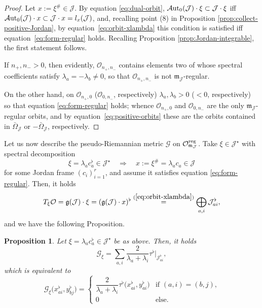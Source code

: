 \documentclass[pdftex]{sigma}
\numberwithin{equation}{section}
\newtheorem{Proposition}[Theorem]{Proposition}
 { \theoremstyle{definition}
\newtheorem{Definition}[Theorem]{Definition}
\newtheorem{Note}[Theorem]{Note}
\newtheorem{Example}[Theorem]{Example}
\newtheorem{Remark}[Theorem]{Remark} }
\newcommand{\be}{\begin{equation}}
\newcommand{\ee}{\end{equation}}
\newcommand{\Aut}{\mathcal{A}{\rm ut}}
\newcommand{\ocal}{\mathcal{O}}
\newcommand{\Jcal}{\mathcal{J}}
\newcommand{\m}{\mathfrak{m}}
\renewcommand{\m}{{\mathfrak m}}
\newcommand{\Gcal}{\mathcal{G}}
\begin{document}
\begin{proof}
Let $x := \xi^\# \in \Jcal$.
By equation \eqref{eq:dual-orbit}, $\Aut_0(\Jcal) \cdot \xi \subset \Jcal \cdot \xi$ iff $\Aut_0(\Jcal) \cdot x \subset \Jcal \cdot x = l_x(\Jcal)$, and, {recalling point (8) in Proposition \ref{prop:collect-positive-Jordan}}, by equation~\eqref{eq:orbit-xlambda} this condition is satisfied iff equation~\eqref{eq:form-regular} holds.
Recalling Proposition \ref{prop:Jordan-integrable}, the first statement follows.

If $n_+, n_- > 0$, then evidently, $\ocal_{n_+, n_-}$ contains elements two of whose spectral coefficients satisfy $\lambda_a = - \lambda_b \neq 0$, so that $\ocal_{n_+, n_-}$ is not $\m_\Jcal$-regular.

On the other hand, on $\ocal_{n_+, 0}$ ($\ocal_{0, n_-}$, respectively) $\lambda_a, \lambda_b > 0$ ($< 0$, respectively) so that equation \eqref{eq:form-regular} holds; whence $\ocal_{n_+, 0}$ and $\ocal_{0, n_-}$ are the only $\m_\Jcal$-regular orbits, and by equation~\eqref{eq:positive-orbits} these are the orbits contained in $\bar \Omega_\Jcal$ or $-\bar \Omega_\Jcal$, respectively.
\end{proof}

Let us now describe the pseudo-Riemannian metric $\Gcal$ on $\ocal^{\rm reg}_{\m_{\Jcal}}$.
Take $\xi\in\Jcal^{\star}$ with spectral decomposition
\be \label{eq:define-xi}
\xi = \lambda_a c_a^\flat \in \Jcal^\star \quad \Rightarrow \quad x := \xi^\# = \lambda_a c_a \in \Jcal
\ee
for some Jordan frame $(c_i)_{i=1}^r$, and assume it satisfies equation \eqref{eq:form-regular}.
Then, it holds
\[%
T_\xi \ocal = \mathfrak{g}(\Jcal) \cdot \xi = (\mathfrak{g}(\Jcal) \cdot x)^\flat \stackrel{(\ref{eq:orbit-xlambda})}= \bigoplus_{a,i} \Jcal_{ai}^\flat,
\]
and we have the following Proposition.

\begin{Proposition} \label{prop:metric-Jordan}
Let $\xi = \lambda_a c_a^\flat \in \Jcal^\star$ be as above.
Then, it holds
\be \label{eq:G-xi}
\Gcal_\xi = \sum_{a,i} \frac2{\lambda_a + \lambda_i} \tau^\flat|_{\Jcal_{ai}^\flat},
\ee
which is equivalent to
\[
\Gcal_\xi\big(x_{ai}^\flat, y_{bj}^\flat\big) = \begin{cases} \dfrac2{\lambda_a + \lambda_i} \tau^\flat\big(x_{ai}^\flat, y_{ai}^\flat\big) & \text{if $(a,i) = (b,j)$,}\\[1mm] 0 & \text{else.} \end{cases}
\]
\end{Proposition}
\end{document}
